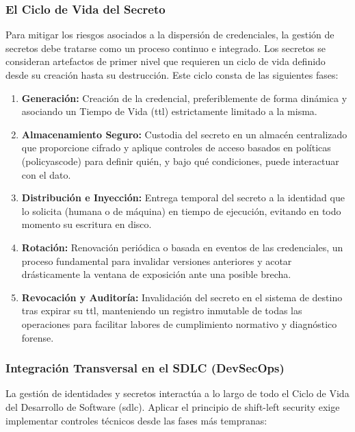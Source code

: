 \documentclass[runningheads]{llncs}
\begin{document}
\subsubsection{El Ciclo de Vida del Secreto}

Para mitigar los riesgos asociados a la dispersión de credenciales, la gestión de secretos debe tratarse como un proceso continuo e integrado. Los secretos se consideran artefactos de primer nivel que requieren un ciclo de vida definido desde su creación hasta su destrucción. Este ciclo consta de las siguientes fases:

\begin{enumerate}
    \item \textbf{Generación:} Creación de la credencial, preferiblemente de forma dinámica y asociando un Tiempo de Vida (\gls{ttl}) estrictamente limitado a la misma.
    \item \textbf{Almacenamiento Seguro:} Custodia del secreto en un almacén centralizado que proporcione cifrado y aplique controles de acceso basados en políticas (\gls{policyascode}) para definir quién, y bajo qué condiciones, puede interactuar con el dato.
    \item \textbf{Distribución e Inyección:} Entrega temporal del secreto a la identidad que lo solicita (humana o de máquina) en tiempo de ejecución, evitando en todo momento su escritura en disco.
    \item \textbf{Rotación:} Renovación periódica o basada en eventos de las credenciales, un proceso fundamental para invalidar versiones anteriores y acotar drásticamente la ventana de exposición ante una posible brecha.
    \item \textbf{Revocación y Auditoría:} Invalidación del secreto en el sistema de destino tras expirar su \gls{ttl}, manteniendo un registro inmutable de todas las operaciones para facilitar labores de cumplimiento normativo y diagnóstico forense.
\end{enumerate}

\subsubsection{Integración Transversal en el SDLC (DevSecOps)}

La gestión de identidades y secretos interactúa a lo largo de todo el Ciclo de Vida del Desarrollo de Software (\gls{sdlc}). Aplicar el principio de shift-left security exige implementar controles técnicos desde las fases más tempranas:
\end{document}
